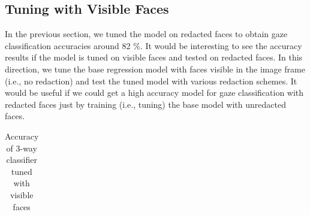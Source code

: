 \subsection{Tuning with Visible Faces}
In the previous section, we tuned the model on redacted faces to obtain gaze classification accuracies around 82 \%. It would be interesting to see the accuracy results if the model is tuned on visible faces and tested on redacted faces. In this direction, we tune the base regression model with faces visible in the image frame (i.e., no redaction) and test the tuned model with various redaction schemes. It would be useful if we could get a high accuracy model for gaze classification with redacted faces just by training (i.e., tuning) the base model with unredacted faces.

\begin{table}[h]
  \centering
    \caption{Accuracy of 3-way classifier tuned with visible faces}
    \label{tab:3way_tune-visibleFaces}
    \begin{tabular}{|c||c|c|c|c|}
      \hline

\end{tabular}
\end{table}
